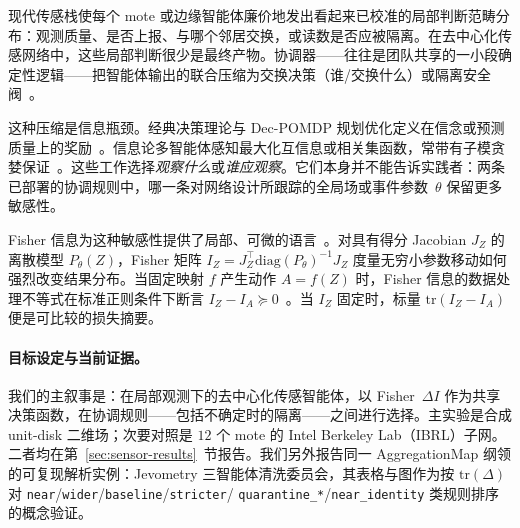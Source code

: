 \documentclass[11pt,a4paper]{article}
\begin{document}
现代传感栈使每个 mote 或边缘智能体廉价地发出看起来已校准的局部判断范畴分布：观测质量、是否上报、与哪个邻居交换，或读数是否应被隔离。在去中心化传感网络中，这些局部判断很少是最终产物。协调器——往往是团队共享的一小段确定性逻辑——把智能体输出的联合压缩为交换决策（谁/交换什么）或隔离安全阀~\citep{jevometry2026}。

这种压缩是信息瓶颈。经典决策理论与 Dec-POMDP 规划优化定义在信念或预测质量上的奖励~\citep{lauri2020prediction,lauri2020decpomdp,oliehoek2016decpomdp}。信息论多智能体感知最大化互信息或相关集函数，常带有子模贪婪保证~\citep{krause2008near,nemhauser1978analysis,corah2021scalable,shi2026imas2}。这些工作选择\emph{观察什么}或\emph{谁应观察}。它们本身并不能告诉实践者：两条已部署的协调规则中，哪一条对网络设计所跟踪的全局场或事件参数~$\theta$ 保留更多敏感性。

Fisher 信息为这种敏感性提供了局部、可微的语言~\citep{fisher1925theory,amari2016information}。对具有得分 Jacobian $J_Z$ 的离散模型 $P_\theta(Z)$，Fisher 矩阵 $I_Z=J_Z^\top \mathrm{diag}(P_\theta)^{-1} J_Z$ 度量无穷小参数移动如何强烈改变结果分布。当固定映射 $f$ 产生动作 $A=f(Z)$ 时，Fisher 信息的数据处理不等式在标准正则条件下断言 $I_Z-I_A\succeq 0$~\citep{zamir1998fisherdpi,cover2006elements}。当 $I_Z$ 固定时，标量 $\mathrm{tr}(I_Z-I_A)$ 便是可比较的损失摘要。

\paragraph{目标设定与当前证据。}
我们的主叙事是：在局部观测下的去中心化传感智能体，以 Fisher~$\Delta I$ 作为共享决策函数，在协调规则——包括不确定时的隔离——之间进行选择。主实验是合成 unit-disk 二维场；次要对照是 $12$ 个 mote 的 Intel Berkeley Lab（IBRL）子网。二者均在第~\ref{sec:sensor-results}~节报告。我们另外报告同一 AggregationMap 纲领的可复现解析实例：Jevometry 三智能体清洗委员会，其表格与图作为按 $\mathrm{tr}(\Delta)$ 对
\texttt{near}/\texttt{wider}/\texttt{baseline}/\texttt{stricter}/
\texttt{quarantine\_*}/\texttt{near\_identity} 类规则排序的概念验证。
\end{document}

